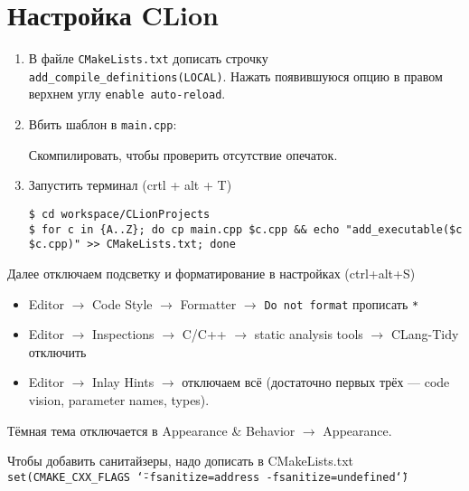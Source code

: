 \section{Настройка CLion}
\begin{enumerate}
    \item В файле \texttt{CMakeLists.txt} дописать строчку \texttt{add\_compile\_definitions(LOCAL)}.
    Нажать появившуюся опцию в правом верхнем углу \texttt{enable auto-reload}.
    \item Вбить шаблон в \texttt{main.cpp}:
    
    Скомпилировать, чтобы проверить отсутствие опечаток.
    \item Запустить терминал (crtl + alt + T)
    \begin{lstlisting}
$ cd workspace/CLionProjects
$ for c in {A..Z}; do cp main.cpp $c.cpp && echo "add_executable($c $c.cpp)" >> CMakeLists.txt; done\end{lstlisting}
\end{enumerate}
Далее отключаем подсветку и форматирование в настройках (ctrl+alt+S)
\begin{itemize}
    \item Editor $\to$ Code Style $\to$ Formatter $\to$ \texttt{Do not format} прописать \texttt{*}
    \item Editor $\to$ Inspections $\to$ C/C++ $\to$ static analysis tools $\to$ CLang-Tidy отключить
    \item Editor $\to$ Inlay Hints $\to$ отключаем всё (достаточно первых трёх --- code vision, parameter names, types).
\end{itemize}
Тёмная тема отключается в Appearance \& Behavior $\to$ Appearance.

Чтобы добавить санитайзеры, надо дописать в CMakeLists.txt \texttt{set(CMAKE\_CXX\_FLAGS \texttt{\char`\"}-fsanitize=address -fsanitize=undefined\texttt{\char`\"})}